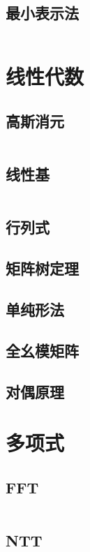 \documentclass[10pt, a4paper, oneside]{ctexart}
\begin{document}
\begin{multicols}{2}
        \subsection{最小表示法}
        \inputminted{cpp}{src/string/min_pos.cpp}

        \section{线性代数}
        \subsection{高斯消元}
        \inputminted{cpp}{src/linear/gauss.cpp}
        \subsection{线性基}
        \inputminted{cpp}{src/linear/basis.cpp}
        \subsection{行列式}
        
        \subsection{矩阵树定理}
        
        \subsection{单纯形法}
        
        \subsection{全幺模矩阵}
        
        \subsection{对偶原理}
        

        \section{多项式}
        \subsection{FFT}
        \inputminted{cpp}{src/poly/fft.cpp}
        \subsection{NTT}
        \inputminted{cpp}{src/poly/ntt.cpp}

\end{multicols}
\end{document}
